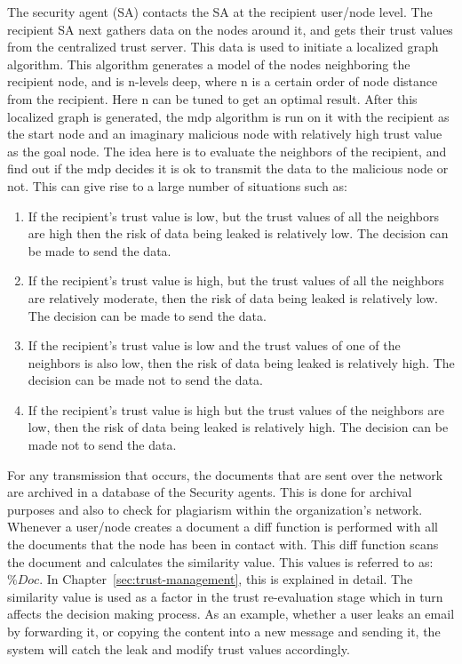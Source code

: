 The security agent (SA)
contacts the SA at the recipient user/node level. The recipient SA next
gathers data on the nodes around it, and gets their trust values from the
centralized trust server. This data is used to initiate a localized graph
algorithm. This algorithm generates a model of the nodes neighboring the
recipient node, and is n-levels deep, where n is a certain order of node
distance from the recipient. Here n can be tuned to get an optimal result.
After this localized graph is generated, the \gls{mdp} algorithm is run on it with
the recipient as the start node and an imaginary malicious node with
relatively high trust value as the goal node. The idea here is to evaluate
the neighbors of the recipient, and find out if the \gls{mdp} decides it is ok to
transmit the data to the malicious node or not. This can give rise to
a large number of situations such as:
\begin{enumerate}
    \item If the recipient's trust value is low, but the trust values of all the
        neighbors are high then the risk of data being leaked is relatively low. The
        decision can be made to send the data.
    \item If the recipient's trust value is high, but the trust values of all the
        neighbors are relatively moderate, then the risk of data being leaked is
        relatively low. The decision can be made to send the data.
    \item If the recipient's trust value is low and the trust values of one of the
        neighbors is also low, then the risk of data being leaked is relatively
        high. The decision can be made not to send the data.
    \item If the recipient's trust value is high but the trust values of the neighbors
are low, then the risk of data being leaked is relatively high. The decision
can be made not to send the data.  
\end{enumerate}
For any transmission that occurs, the
documents that are sent over the network are archived in a database of the
Security agents. This is done for archival purposes and also to check for
plagiarism within the organization's network. Whenever a user/node creates
a document a diff function is performed with all the documents that the node
has been in contact with. This diff function scans the document and
calculates the similarity value. This values is referred to as: \(\%Doc\). In
Chapter~\ref{sec:trust-management}, this is explained in detail. The similarity value is used as a factor in
the trust re-evaluation stage which in turn affects the decision making
process. As an example, whether a user leaks an email by forwarding it, or
copying the content into a new message and sending it, the system will catch
the leak and modify trust values accordingly.

